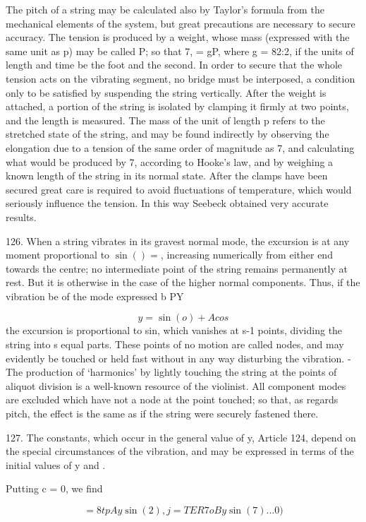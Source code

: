 The pitch of a string may be calculated also by Taylor's formula from the
mechanical elements of the system, but great precautions are necessary to
secure accuracy. The tension is produced by a weight, whose mass (expressed
with the same unit as p) may be called P; so that 7, = gP, where g = 82:2, if
the units of length and time be the foot and the second. In order to secure
that the whole tension acts on the vibrating segment, no bridge must be
interposed, a condition only to be satisfied by suspending the string
vertically. After the weight is attached, a portion of the string is isolated
by clamping it firmly at two points, and the length is measured. The mass of
the unit of length p refers to the stretched state of the string, and may be
found indirectly by observing the elongation due to a tension of the same order
of magnitude as 7, and calculating what would be produced by 7, according to
Hooke's law, and by weighing a known length of the string in its normal state.
After the clamps have been secured great care is required to avoid fluctuations
of temperature, which would seriously influence the tension. In this way
Seebeck obtained very accurate results.

126. When a string vibrates in its gravest normal mode, the excursion is at any
moment proportional to \(\sin()=\), increasing numerically from either end
towards the centre; no intermediate point of the string remains permanently at
rest. But it is otherwise in the case of the higher normal components. Thus, if
the vibration be of the mode expressed b PY

\[y= \sin(o) + A cos\]
the excursion is proportional to sin, which vanishes at
s-1 points, dividing the string into s equal parts. These points of no motion
are called nodes, and may evidently be touched or held fast without in any way
disturbing the vibration. - The production of `harmonics' by lightly touching
the string at the points of aliquot division is a well-known resource of the
violinist. All component modes are excluded which have not a node at the point
touched; so that, as regards pitch, the effect is the same as if the string
were securely fastened there.

127. The constants, which occur in the general value of y, Article 124, depend
on the special circumstances of the vibration, and may be expressed in terms of
the initial values of y and .

Putting c = 0, we find

\[=8tp Ay \sin(2), j= TE R7 oBy \sin(7)... 0)\]

